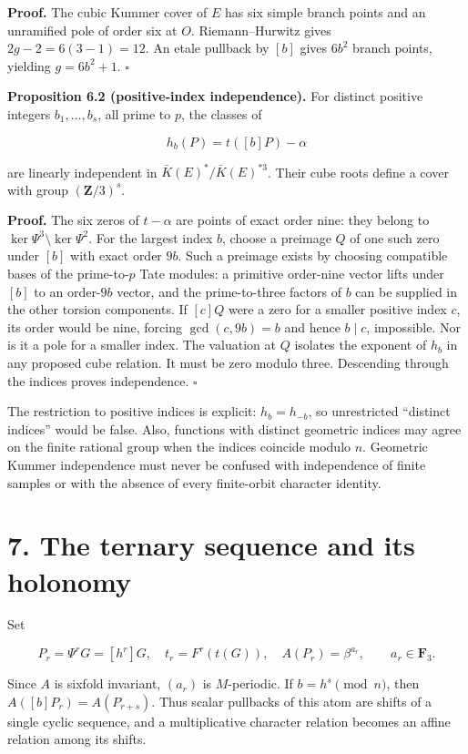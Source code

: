 \documentclass[
  11pt,
  a4paper,
]{article}
\begin{document}
\textbf{Proof.} The cubic Kummer cover of \(E\) has six simple branch
points and an unramified pole of order six at \(O\). Riemann--Hurwitz
gives \(2g-2=6(3-1)=12\). An etale pullback by \([b]\) gives \(6b^2\)
branch points, yielding \(g=6b^2+1\). \(\square\)

\textbf{Proposition 6.2 (positive-index independence).} For distinct
positive integers \(b_1,\ldots,b_s\), all prime to \(p\), the classes of

\[
h_b(P)=t([b]P)-\alpha
\]

are linearly independent in \(\bar K(E)^*/\bar K(E)^{*3}\). Their cube
roots define a cover with group \((\mathbf Z/3)^s\).

\textbf{Proof.} The six zeros of \(t-\alpha\) are points of exact order
nine: they belong to \(\ker\Psi^3\setminus\ker\Psi^2\). For the largest
index \(b\), choose a preimage \(Q\) of one such zero under \([b]\) with
exact order \(9b\). Such a preimage exists by choosing compatible bases
of the prime-to-\(p\) Tate modules: a primitive order-nine vector lifts
under \([b]\) to an order-\(9b\) vector, and the prime-to-three factors
of \(b\) can be supplied in the other torsion components. If \([c]Q\)
were a zero for a smaller positive index \(c\), its order would be nine,
forcing \(\gcd(c,9b)=b\) and hence \(b\mid c\), impossible. Nor is it a
pole for a smaller index. The valuation at \(Q\) isolates the exponent
of \(h_b\) in any proposed cube relation. It must be zero modulo three.
Descending through the indices proves independence. \(\square\)

The restriction to positive indices is explicit: \(h_b=h_{-b}\), so
unrestricted ``distinct indices'' would be false. Also, functions with
distinct geometric indices may agree on the finite rational group when
the indices coincide modulo \(n\). Geometric Kummer independence must
never be confused with independence of finite samples or with the
absence of every finite-orbit character identity.

\section{7. The ternary sequence and its
holonomy}\label{the-ternary-sequence-and-its-holonomy}

Set

\[
P_r=\Psi^rG=[h^r]G,\quad t_r=F^r(t(G)),\quad
A(P_r)=\beta^{a_r},\qquad a_r\in\mathbf F_3.
\]

Since \(A\) is sixfold invariant, \((a_r)\) is \(M\)-periodic. If
\(b=h^s\pmod n\), then \(A([b]P_r)=A(P_{r+s})\). Thus scalar pullbacks
of this atom are shifts of a single cyclic sequence, and a
multiplicative character relation becomes an affine relation among its
shifts.
\end{document}
